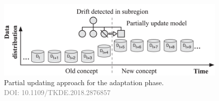 \begin{enumerate}[label=\Alph*.]
 \begin{figure}[!ht]
    \centering
    \includegraphics[width=.9\textwidth]{2_Background/figures/partial_update.png}
    \caption{Partial updating approach for the adaptation phase. \\ \textcolor{gray}{\fontsize{10}{0}\selectfont DOI: 10.1109/TKDE.2018.2876857}}
    \label{fig:concept-drift-partial-update}
\end{figure}
\end{enumerate}